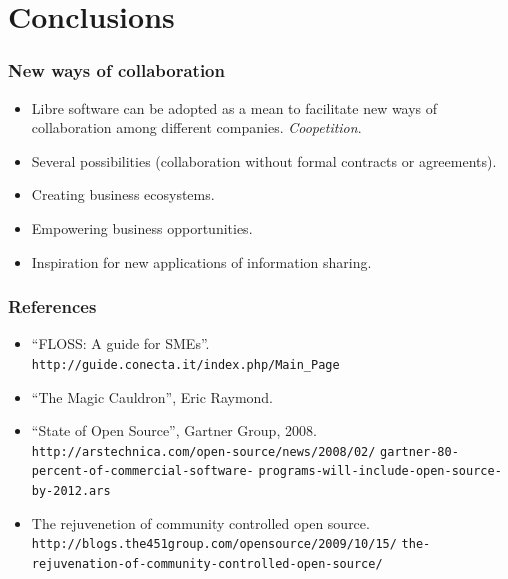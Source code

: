 % 
\section{Conclusions}

\begin{frame}
 \frametitle{New ways of collaboration}
 \begin{itemize}
  \item Libre software can be adopted as a mean to facilitate new ways of collaboration
among different companies. \textit{Coopetition}.
  \item Several possibilities (collaboration without formal contracts or agreements).
  \item Creating business ecosystems.
  \item Empowering business opportunities.
  \item Inspiration for new applications of information sharing.
 \end{itemize}
\end{frame}


\begin{frame}
 \frametitle{References}
 \begin{itemize}
  \item ``FLOSS: A guide for SMEs''.
\texttt{http://guide.conecta.it/index.php/Main\_Page}
  \item ``The Magic Cauldron'', Eric Raymond.
  \item ``State of Open Source'', Gartner Group, 2008.
\texttt{http://arstechnica.com/open-source/news/2008/02/}
\texttt{gartner-80-percent-of-commercial-software-}
\texttt{programs-will-include-open-source-by-2012.ars}
  \item The rejuvenetion of community controlled open source.
\texttt{http://blogs.the451group.com/opensource/2009/10/15/}
\texttt{the-rejuvenation-of-community-controlled-open-source/}
 \end{itemize}

\end{frame}

